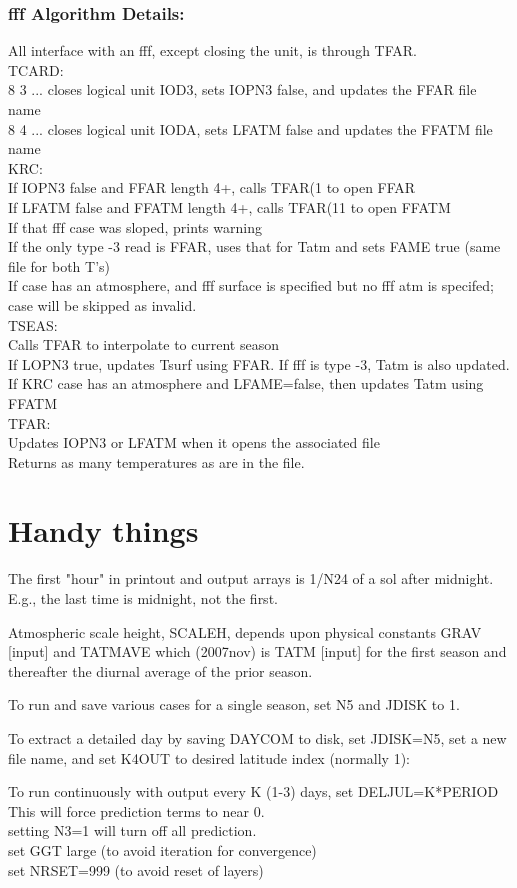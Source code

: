 \documentclass{article}
\newcommand{\qi}{\\ \hspace*{2.em}}      %
\newcommand{\qii}{\\ \hspace*{4.em}}     %
\begin{document}
\subsubsection{fff Algorithm Details:} 
All interface with an fff, except closing the unit, is through TFAR.
\\ TCARD:
\qi 8 3 ... closes logical unit IOD3, sets IOPN3 false, and updates the FFAR file name
\qi 8 4 ... closes logical unit IODA, sets LFATM false and updates the FFATM file name
\\ KRC: 
\qi If IOPN3 false and FFAR length 4+, calls TFAR(1 to open FFAR 
\qi If LFATM false and FFATM length 4+, calls TFAR(11 to open FFATM
\qii If that  fff case was sloped, prints warning 
\qi If the only type -3 read is FFAR, uses that for Tatm and sets FAME true (same file for both T's)
\qi If case has an atmosphere, and fff surface is specified but no fff atm is specifed; case will be skipped as invalid.
\\ TSEAS:
\qi Calls TFAR to interpolate to current season
\qii If LOPN3 true, updates Tsurf using FFAR. If fff is type -3, Tatm is also updated. 
\qii If KRC case has an atmosphere and LFAME=false, then updates Tatm using FFATM
\\ TFAR:
\qi Updates IOPN3 or LFATM when it opens the associated file
\qi Returns as many temperatures as are in the file.

\section{Handy things} %

The first "hour" in printout and output arrays is  1/N24 of a
sol after midnight. E.g., the last time is midnight, not the first.

Atmospheric scale height, SCALEH, depends upon physical constants GRAV [input] 
and TATMAVE which (2007nov) is TATM [input] for the first season and 
thereafter the diurnal average of the prior season. 
 
To run and save various cases for a single season, set N5 and JDISK to 1.

To extract a detailed day by saving DAYCOM to disk, set JDISK=N5, set a new
file name, and set K4OUT to desired latitude index (normally 1):

To run continuously with output every K (1-3) days, set DELJUL=K*PERIOD
This will force prediction terms to near 0.
\qi        setting N3=1 will turn off all prediction.
\qi        set GGT large (to avoid iteration for convergence)
\qi        set NRSET=999 (to avoid reset of layers)
\end{document}

